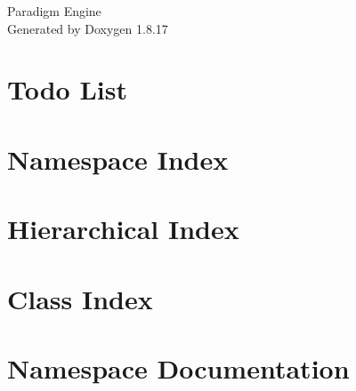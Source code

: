 \let\mypdfximage\pdfximage\def\pdfximage{\immediate\mypdfximage}\documentclass[twoside]{book}
\newcommand{\+}{\discretionary{\mbox{\scriptsize$\hookleftarrow$}}{}{}}
\newcommand{\clearemptydoublepage}{%
  \newpage{\pagestyle{empty}\cleardoublepage}%
}
\begin{document}
\hypersetup{pageanchor=false,
             bookmarksnumbered=true,
             pdfencoding=unicode
            }
\begin{titlepage}
\vspace*{7cm}
\begin{center}%
{\Large Paradigm Engine }\\
\vspace*{1cm}
{\large Generated by Doxygen 1.8.17}\\
\end{center}
\end{titlepage}
\clearemptydoublepage
{}
\tableofcontents
\clearemptydoublepage
{}
\hypersetup{pageanchor=true}

\chapter{Todo List}
\label{todo}

\chapter{Namespace Index}

\chapter{Hierarchical Index}

\chapter{Class Index}

\chapter{Namespace Documentation}

























\end{document}
